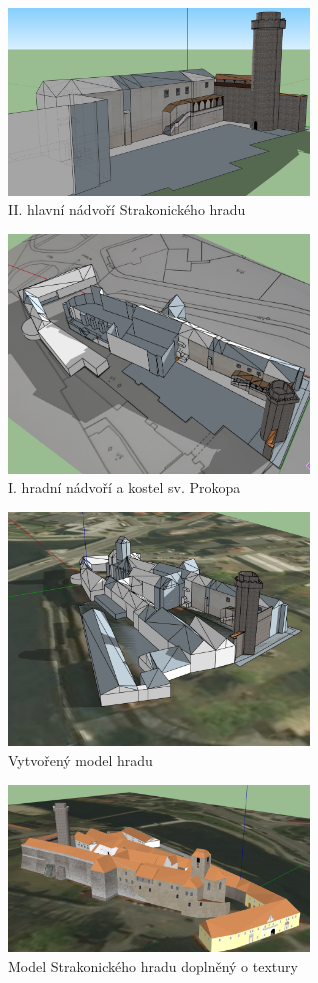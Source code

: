 \documentclass[thesis=M,czech]{FITthesis}[2012/06/26]
\begin{document}
\begin{figure}[h]
	\centering
	\includegraphics[width=8cm]{pics/sketchup2.png}
	\caption{II. hlavní nádvoří Strakonického hradu}
	\label{obrazek:sk2}
\end{figure}

\begin{figure}[h]
	\centering
	\includegraphics[width=8cm]{pics/sketchup3.png}
	\caption{I. hradní nádvoří a kostel sv. Prokopa}
	\label{obrazek:sk3}
\end{figure}

\begin{figure}[h]
	\centering
	\includegraphics[width=8cm]{pics/sketchup4.png}
	\caption{Vytvořený model hradu}
	\label{obrazek:sk4}
\end{figure}

\begin{figure}[h]
	\centering
	\includegraphics[width=8cm]{pics/sketchup5.png}
	\caption{Model Strakonického hradu doplněný o textury}
	\label{obrazek:sk5}
\end{figure}
\end{document}
